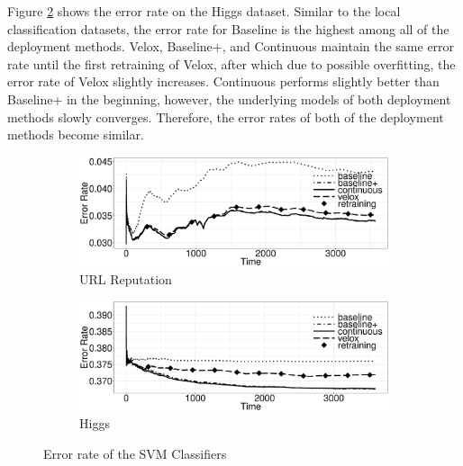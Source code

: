 \documentclass{vldb}
\begin{document}
Figure \ref{fig:higgs-quality} shows the error rate on the Higgs dataset.
Similar to the local classification datasets, the error rate for Baseline is the highest among all of the deployment methods.
Velox, Baseline+, and Continuous maintain the same error rate until the first retraining of Velox, after which due to possible overfitting, the error rate of Velox slightly increases.
Continuous performs slightly better than Baseline+ in the beginning, however, the underlying models of both deployment methods slowly converges.
Therefore, the error rates of both of the deployment methods become similar.

\begin{figure}[h]
	\centering
\begin{subfigure}[b]{\columnwidth}
	\includegraphics[width=\columnwidth,height=0.4\columnwidth]{../images/experiment-results/url-reputation-quality.eps}
	\caption{URL Reputation}
	\label{fig:url-quality}
\end{subfigure}
\begin{subfigure}[b]{\columnwidth}
  	\includegraphics[width=\columnwidth,height=0.4\columnwidth]{../images/experiment-results/higgs-quality.eps}
	\caption{Higgs}
	\label{fig:higgs-quality}
\end{subfigure}
\vspace{2mm}
\caption{Error rate of the SVM Classifiers}
\label{fig:cluster-classification-results}
\end{figure}
\end{document}
